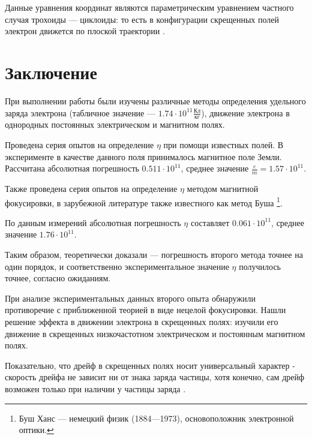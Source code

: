 Данные уравнения координат являются параметрическим уравнением частного случая трохоиды --- циклоиды: то есть в конфигурации скрещенных полей электрон движется по плоской траектории \cite{bellustin,arcimovich,andreev}.
% 
\section*{Заключение}

При выполнении работы были изучены различные методы определения удельного заряда электрона (табличное значение --- $1.74\cdot10^{11}\frac{\text{Кл}}{\text{кг}}$), движение электрона в однородных постоянных электрическом и магнитном полях.

Проведена серия опытов на определение $\eta$ при помощи известных полей. В эксперименте в качестве данного поля принималось магнитное поле Земли. Рассчитана абсолютная погрешность $0.511\cdot10^{11}$, среднее значение $\frac{e}{m}=1.57\cdot10^{11}$.

Также проведена серия опытов на определение $\eta$ методом магнитной фокусировки, в зарубежной литературе также известного как метод Буша%
\footnote{Буш Ханс --- немецкий физик (1884—1973), основоположник электронной оптики.}.

По данным измерений абсолютная погрешность $\eta$ составляет  $0.061\cdot10^{11}$, среднее значение $1.76\cdot10^{11}$.

Таким образом, теоретически доказали --- погрешность второго метода точнее на один порядок, и соответственно экспериментальное значение $\eta$ получилось точнее, согласно ожиданиям.

При анализе экспериментальных данных второго опыта обнаружили противоречие с приближенной теорией в виде нецелой фокусировки. Нашли решение эффекта в движении электрона в скрещенных полях: изучили его движение в скрещенных низкочастотном электрическом и постоянным магнитном полях. 

Показательно, что дрейф в скрещенных полях носит универсальный характер - скорость дрейфа не зависит ни от знака заряда частицы, хотя конечно, сам дрейф возможен только при наличии у частицы заряда \cite{radantscev}.


\newpage


